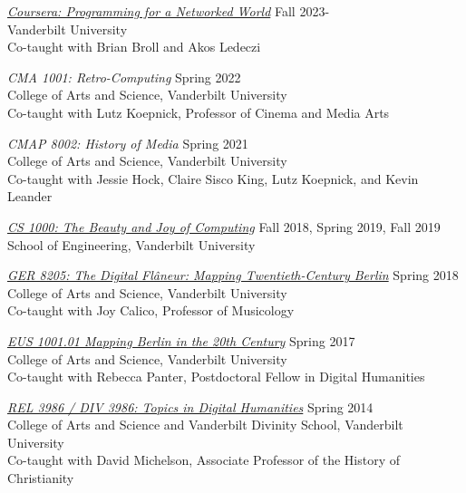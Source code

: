 \documentclass[]{res} %
\begin{document}
\begin{resume}
\vspace{8pt} %

{\sl \href{https://www.coursera.org/learn/programming-for-a-networked-world}{Coursera: Programming for a Networked World}} \hfill Fall 2023- \\ Vanderbilt University \\ Co-taught with Brian Broll and Akos Ledeczi

{\sl CMA 1001: Retro-Computing} \hfill Spring 2022 \\ College of Arts and Science, Vanderbilt University \\ Co-taught with Lutz Koepnick, Professor of Cinema and Media Arts

{\sl CMAP 8002: History of Media} \hfill Spring 2021 \\ College of Arts and Science, Vanderbilt University \\ Co-taught with Jessie Hock, Claire Sisco King, Lutz Koepnick, and Kevin Leander

{\sl \href{https://github.com/CliffordAnderson/CS1000/blob/master/readme.md}{CS 1000: The Beauty and Joy of Computing}} \hfill Fall 2018, Spring 2019, Fall 2019 \\ School of Engineering, Vanderbilt University

{\sl \href{https://www.vanderbilt.edu/digitalhumanities/the-digital-flaneur-mapping-twentieth-century-berlin/}{GER 8205: The Digital Flâneur: Mapping Twentieth-Century Berlin}} \hfill Spring 2018 \\ College of Arts and Science, Vanderbilt University \\ Co-taught with Joy Calico, Professor of Musicology

{\sl \href{https://commons.vanderbilt.edu/majorprograms/EUS_1001.pdf}{EUS 1001.01 Mapping Berlin in the 20th Century}} \hfill Spring 2017 \\ College of Arts and Science, Vanderbilt University \\ Co-taught with Rebecca Panter, Postdoctoral Fellow in Digital Humanities

{\sl \href{http://paralipomena.com/}{REL 3986 / DIV 3986: Topics in Digital Humanities}} \hfill Spring 2014 \\ College of Arts and Science and Vanderbilt Divinity School, Vanderbilt University \\ Co-taught with David Michelson, Associate Professor of the History of Christianity 



\end{resume}
\end{document}
